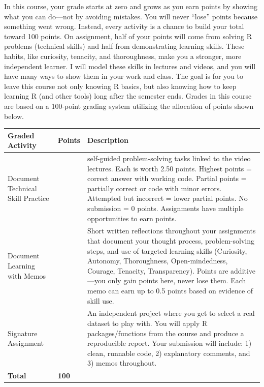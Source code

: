 \documentclass[
  12pt,
]{scrreprt}
\begin{document}
In this course, your grade starts at zero and grows as you earn points
by showing what you can do---not by avoiding mistakes. You will never
``lose'' points because something went wrong. Instead, every activity is
a chance to build your total toward 100 points. On assignment, half of
your points will come from solving R problems (technical skills) and
half from demonstrating learning skills. These habits, like curiosity,
tenacity, and thoroughness, make you a stronger, more independent
learner. I will model these skills in lectures and videos, and you will
have many ways to show them in your work and class. The goal is for you
to leave this course not only knowing R basics, but also knowing how to
keep learning R (and other tools) long after the semester ends. Grades
in this course are based on a 100-point grading system utilizing the
allocation of points shown below.

\begin{table}[!h]
\centering\begingroup\fontsize{9}{11}\selectfont

\begin{tabular}[t]{>{\raggedright\arraybackslash}p{4.2cm}>{\centering\arraybackslash}p{1.2cm}>{\raggedright\arraybackslash}p{10.5cm}}
\toprule
\textbf{Graded Activity} & \textbf{Points} & \textbf{Description}\\
\midrule
Document Technical Skill Practice & 40 & 14 self-guided problem-solving tasks linked to the video lectures. Each is worth 2.50 points. Highest points = correct answer with working code. Partial points = partially correct or code with minor errors. Attempted but incorrect = lower partial points. No submission = 0 points. Assignments have multiple opportunities to earn points.\\
Document Learning with Memos & 40 & Short written reflections throughout your assignments that document your thought process, problem-solving steps, and use of targeted learning skills (Curiosity, Autonomy, Thoroughness, Open-mindedness, Courage, Tenacity, Transparency). Points are additive—you only gain points here, never lose them. Each memo can earn up to 0.5 points based on evidence of skill use.\\
Signature Assignment & 20 & An independent project where you get to select a real dataset to play with. You will apply R packages/functions from the course and produce a reproducible report. Your submission will include: 1) clean, runnable code, 2) explanatory comments, and 3) memos throughout.\\
\textbf{Total} & \textbf{100} & \textbf{}\\
\bottomrule
\end{tabular}
\endgroup{}
\end{table}
\end{document}
